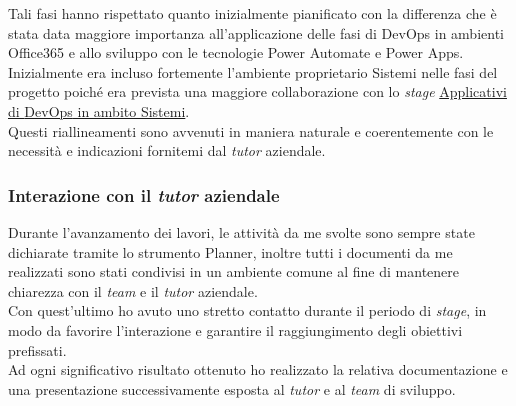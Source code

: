 \noindent Tali fasi hanno rispettato quanto inizialmente pianificato con la differenza che è stata data maggiore importanza all'applicazione delle fasi di \gls{DevOps} in ambienti Office365 e allo sviluppo con le tecnologie Power Automate e Power Apps.\\
Inizialmente era incluso fortemente l'ambiente proprietario \gls{Sistemi} nelle fasi del progetto poiché era prevista una maggiore collaborazione con lo \emph{stage} \hyperref[stageDavide]{Applicativi di \gls{DevOps} in ambito Sistemi}.\\
Questi riallineamenti sono avvenuti in maniera naturale e coerentemente con le necessità e indicazioni fornitemi dal \emph{tutor} aziendale.\\
\subsubsection*{Interazione con il \emph{tutor} aziendale}
Durante l'avanzamento dei lavori, le attività da me svolte sono sempre state dichiarate tramite lo strumento Planner, inoltre tutti i documenti da me realizzati sono stati condivisi in un ambiente comune al fine di mantenere chiarezza con il \emph{team} e il \emph{tutor} aziendale.\\
Con quest'ultimo ho avuto uno stretto contatto durante il periodo di \emph{stage}, in modo da favorire l'interazione e garantire il raggiungimento degli obiettivi prefissati.\\
Ad ogni significativo risultato ottenuto ho realizzato la relativa documentazione e una presentazione successivamente esposta al \emph{tutor} e al \emph{team} di sviluppo.\\

